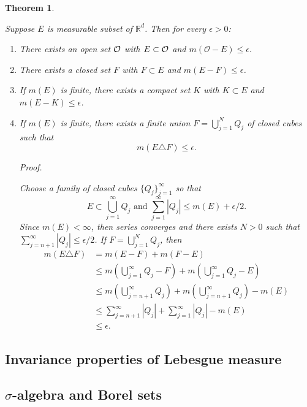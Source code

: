 \documentclass[
]{book}
\providecommand{\tightlist}{%
  \setlength{\itemsep}{0pt}\setlength{\parskip}{0pt}}
\newtheorem{theorem}{Theorem}[chapter]
\theoremstyle{definition}
\theoremstyle{definition}
\theoremstyle{definition}
\theoremstyle{definition}
\theoremstyle{remark}
\begin{document}
\begin{theorem}
\protect\hypertarget{thm:m}{}\label{thm:m}

Suppose \(E\) is measurable subset of \(\mathbb{R}^d\). Then for every \(\epsilon>0\):

\begin{enumerate}
\def\labelenumi{\arabic{enumi}.}
\tightlist
\item
  There exists an open set \(\cal O\) with \(E\subset \cal O\) and \(m(\mathcal{O}-E)\leq\epsilon\).
\item
  There exists a closed set \(F\) with \(F\subset E\) and \(m(E-F)\leq\epsilon\).
\item
  If \(m(E)\) is finite, there exists a compact set \(K\) with \(K\subset E\) and \(m(E-K)\leq \epsilon\).
\item
  If \(m(E)\) is finite, there exists a finite union \(F=\bigcup_{j=1}^NQ_j\) of closed cubes such that
  \[
  m(E\triangle F)\leq \epsilon.
  \]

  \emph{Proof.}

  Choose a family of closed cubes \(\{Q_j\}_{j=1}^{\infty}\) so that
  \[
    E\subset \bigcup_{j=1}^{\infty}Q_j \text{ and } \sum_{j=1}^{\infty}|Q_j|\le m(E) +\epsilon/2.
  \]
  Since \(m(E) <\infty\), then series converges and there exists \(N>0\) such that \(\sum_{j=n+1}^{\infty}|Q_j|\le \epsilon/2\). If \(F=\bigcup_{j=1}^NQ_j\), then
  \[
   \begin{aligned}
   m(E\triangle F) &= m(E-F)+m(F-E)\\
   &\le m\left( \bigcup_{j=1}^{\infty}Q_j - F\right)+m\left( \bigcup_{j=1}^{\infty}Q_j-E\right)\\
   &\le m\left( \bigcup_{j=n+1}^{\infty}Q_j\right)+ m\left( \bigcup_{j=n+1}^{\infty}Q_j\right)-m(E)\\
   &\le \sum_{j=n+1}^{\infty}|Q_j|+\sum_{j=1}^{\infty}|Q_j|-m(E)\\
   &\le \epsilon.
   \end{aligned}
  \]
\end{enumerate}

\end{theorem}

\subsection{Invariance properties of Lebesgue measure}\label{invariance-properties-of-lebesgue-measure}

\subsection{\texorpdfstring{\(\sigma\)-algebra and Borel sets}{\textbackslash sigma-algebra and Borel sets}}\label{sigma-algebra-and-borel-sets}
\end{document}
